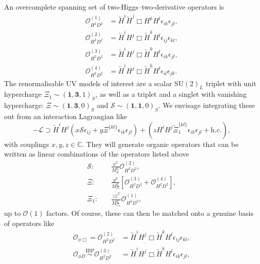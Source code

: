An overcomplete spanning set of two-Higgs--two-derivative operators is
\begin{subequations}
  \begin{align}
    \mathcal{O}_{H^{2}D^{2}}^{(1)} &= \tilde{H}^{i}\tilde{H}^{j} \Box H^{k} H^{l} \epsilon_{ik} \epsilon_{jl}, \\
    \mathcal{O}_{H^{2}D^{2}}^{(2)} &= \tilde{H}^{i}H^{j} \Box \tilde{H}^{k} H^{l} \epsilon_{ij} \epsilon_{kl}, \\
    \mathcal{O}_{H^{2}D^{2}}^{(3)} &= \tilde{H}^{i}H^{j} \Box \tilde{H}^{k} H^{l} \epsilon_{ik} \epsilon_{jl}, \\
    \mathcal{O}_{H^{2}D^{2}}^{(4)} &= \tilde{H}^{i}H^{j} \Box \tilde{H}^{k} H^{l} \epsilon_{il} \epsilon_{jk}.
  \end{align}
\end{subequations}
The renormalisable UV models of interest are a scalar $\mathrm{SU}(2)_{L}$
triplet with unit hypercharge
$\Xi_{1} \sim (\mathbf{1}, \mathbf{3}, 1)_{S}$, as well as a triplet and a
singlet with vanishing hypercharge:
$\Xi\sim (\mathbf{1}, \mathbf{3}, 0)_{S}$ and
$\mathcal{S} \sim (\mathbf{1}, \mathbf{1}, 0)_{S}$. We envisage integrating
these out from an interaction Lagrangian like
\begin{equation}
  -\mathscr{L} \supset \tilde{H}^{i} H^{j} (x \mathcal{S} \epsilon_{ij} + y \Xi^{\{kl\}}\epsilon_{ik}\epsilon_{jl}) + (z H^{i}H^{j} \tilde{\Xi}_{1}^{\{kl\}} \epsilon_{ik} \epsilon_{jl} + \text{h.c.}),
\end{equation}
with couplings $x, y, z \in \mathbb{C}$. They will generate organic operators
that can be written as linear combinations of the operators listed above
\begin{subequations}
  \label{eq:organic-ops}
  \begin{align}
    \mathcal{S}: &\quad \frac{x^{2}}{M_{\mathcal{S}}^{2}} \mathcal{O}_{H^{2}D^{2}}^{(2)}, \\
    \Xi: &\quad \frac{y^{2}}{M_{\Xi}^{2}} \left[ \mathcal{O}_{H^{2}D^{2}}^{(3)} + \mathcal{O}_{H^{2}D^{2}}^{(4)} \right], \label{eq:organic-ops-2} \\
    \Xi_{1}: &\quad \frac{|z|^{2}}{M_{\Xi_{1}}^{2}} \mathcal{O}_{H^{2}D^{2}}^{(1)},
  \end{align}
\end{subequations}
up to $\mathcal{O}(1)$ factors. Of course, these can then be matched onto a
genuine basis of operators like
\begin{subequations}\label{eq:2h2d-basis}
  \begin{align}
    \mathcal{O}_{\phi \Box} = \mathcal{O}_{H^{2}D^{2}}^{(2)} &= \tilde{H}^{i}H^{j} \Box \tilde{H}^{k}H^{l} \epsilon_{ij} \epsilon_{kl}, \\
    \mathcal{O}_{\phi D} \overset{\text{IBP}}{\sim} \mathcal{O}_{H^{2}D^{2}}^{(3)} &= \tilde{H}^{i}H^{j} \Box \tilde{H}^{k}H^{l} \epsilon_{ik} \epsilon_{jl},
  \end{align}
\end{subequations}
